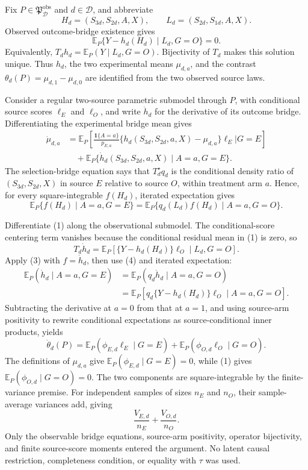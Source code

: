 Fix \(P\in\mathfrak P_{\mathcal D}^{\mathrm{obs}}\) and \(d\in\mathcal D\), and abbreviate
\[
 H_d=(S_{3d},S_{2d},A,X),\qquad L_d=(S_{2d},S_{1d},A,X).
\]
Observed outcome-bridge existence gives
\[
 \mathbb E_P\{Y-h_d(H_d)\mid L_d,G=O\}=0. \tag{1}
\]
Equivalently, \(T_dh_d=\mathbb E_P(Y\mid L_d,G=O)\).  Bijectivity of \(T_d\) makes this solution unique.  Thus \(h_d\), the two experimental means \(\mu_{d,a}\), and the contrast \(\theta_d(P)=\mu_{d,1}-\mu_{d,0}\) are identified from the two observed source laws.

Consider a regular two-source parametric submodel through \(P\), with conditional source scores \(\ell_E\) and \(\ell_O\), and write \(\dot h_d\) for the derivative of its outcome bridge.  Differentiating the experimental bridge mean gives
\[
\begin{aligned}
 \dot\mu_{d,a}
 &=\mathbb E_P\!\left[
   \frac{\mathbf 1\{A=a\}}{p_{E,a}}
   \{h_d(S_{3d},S_{2d},a,X)-\mu_{d,a}\}\ell_E
   \mathrel{\Big|}G=E\right]\\
 &\quad+\mathbb E_P\{\dot h_d(S_{3d},S_{2d},a,X)\mid A=a,G=E\}.
\end{aligned} \tag{2}
\]
The selection-bridge equation says that \(T_d^\star q_d\) is the conditional density ratio of \((S_{3d},S_{2d},X)\) in source \(E\) relative to source \(O\), within treatment arm \(a\).  Hence, for every square-integrable \(f(H_d)\), iterated expectation gives
\[
 \mathbb E_P\{f(H_d)\mid A=a,G=E\}
 =\mathbb E_P\{q_d(L_d)f(H_d)\mid A=a,G=O\}. \tag{3}
\]

Differentiate (1) along the observational submodel.  The conditional-score centering term vanishes because the conditional residual mean in (1) is zero, so
\[
 T_d\dot h_d
 =\mathbb E_P[\{Y-h_d(H_d)\}\ell_O\mid L_d,G=O]. \tag{4}
\]
Apply (3) with \(f=\dot h_d\), then use (4) and iterated expectation:
\[
\begin{aligned}
 \mathbb E_P(\dot h_d\mid A=a,G=E)
 &=\mathbb E_P(q_d\dot h_d\mid A=a,G=O)\\
 &=\mathbb E_P[q_d\{Y-h_d(H_d)\}\ell_O\mid A=a,G=O].
\end{aligned} \tag{5}
\]
Subtracting the derivative at \(a=0\) from that at \(a=1\), and using source-arm positivity to rewrite conditional expectations as source-conditional inner products, yields
\[
 \dot\theta_d(P)
 =\mathbb E_P(\phi_{E,d}\ell_E\mid G=E)
  +\mathbb E_P(\phi_{O,d}\ell_O\mid G=O). \tag{6}
\]
The definitions of \(\mu_{d,a}\) give \(\mathbb E_P(\phi_{E,d}\mid G=E)=0\), while (1) gives \(\mathbb E_P(\phi_{O,d}\mid G=O)=0\).  The two components are square-integrable by the finite-variance premise.  For independent samples of sizes \(n_E\) and \(n_O\), their sample-average variances add, giving
\[
 \frac{V_{E,d}}{n_E}+\frac{V_{O,d}}{n_O}.
\]
Only the observable bridge equations, source-arm positivity, operator bijectivity, and finite source-score moments entered the argument.  No latent causal restriction, completeness condition, or equality with \(\tau\) was used.